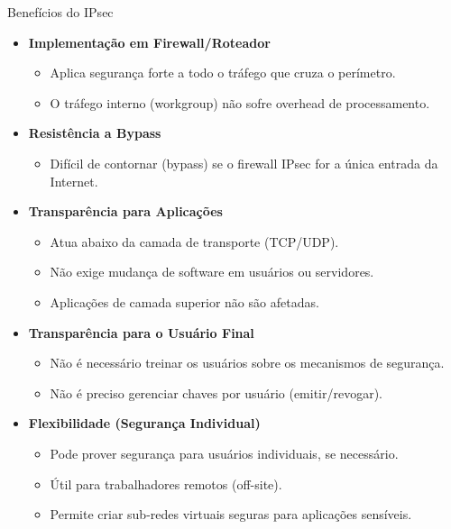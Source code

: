 \begin{frame}{Benefícios do IPsec}
    \begin{itemize}
        \item \textbf{Implementação em Firewall/Roteador}
              \begin{itemize}
                  \item Aplica segurança forte a todo o tráfego que cruza o perímetro.
                  \item O tráfego interno (workgroup) não sofre overhead de processamento.
              \end{itemize}

        \item \textbf{Resistência a Bypass}
              \begin{itemize}
                  \item Difícil de contornar (bypass) se o firewall IPsec for a única entrada da Internet.
              \end{itemize}

        \item \textbf{Transparência para Aplicações}
              \begin{itemize}
                  \item Atua abaixo da camada de transporte (TCP/UDP).
                  \item Não exige mudança de software em usuários ou servidores.
                  \item Aplicações de camada superior não são afetadas.
              \end{itemize}
        \item \textbf{Transparência para o Usuário Final}
              \begin{itemize}
                  \item Não é necessário treinar os usuários sobre os mecanismos de segurança.
                  \item Não é preciso gerenciar chaves por usuário (emitir/revogar).
              \end{itemize}

        \item \textbf{Flexibilidade (Segurança Individual)}
              \begin{itemize}
                  \item Pode prover segurança para usuários individuais, se necessário.
                  \item Útil para trabalhadores remotos (off-site).
                  \item Permite criar sub-redes virtuais seguras para aplicações sensíveis.
              \end{itemize}
    \end{itemize}
\end{frame}

